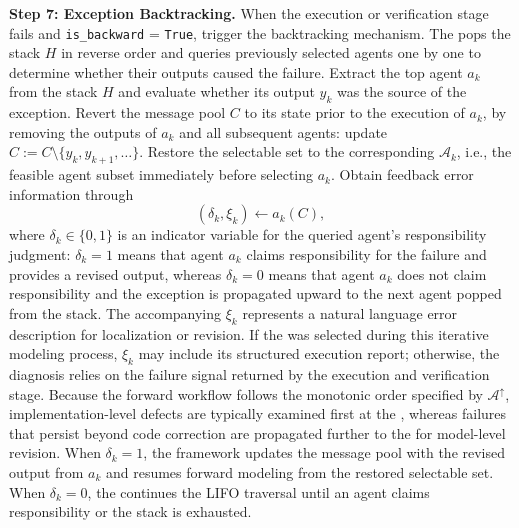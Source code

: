 \documentclass[preprint,12pt]{elsarticle}
\begin{document}
\medskip
\noindent\textbf{Step 7: Exception Backtracking.}
When the execution or verification stage fails and \texttt{is\_backward} = \texttt{True}, trigger the backtracking mechanism. The  pops the stack $H$ in reverse order and queries previously selected agents one by one to determine whether their outputs caused the failure. Extract the top agent $a_k$ from the stack $H$ and evaluate whether its output $y_k$ was the source of the exception. Revert the message pool $C$ to its state prior to the execution of $a_k$, by removing the outputs of $a_k$ and all subsequent agents: update $C:= C\setminus\{y_k,y_{k+1},\ldots\}$. Restore the selectable set to the corresponding $\mathcal{A}_k$, i.e., the feasible agent subset immediately before selecting $a_k$. Obtain feedback error information through
\begin{equation}
\left(\delta_k,\xi_k\right)\gets a_k\left(C\right),
\end{equation}
where $\delta_k\in\{0,1\}$ is an indicator variable for the queried agent's responsibility judgment: $\delta_k=1$ means that agent $a_k$ claims responsibility for the failure and provides a revised output, whereas $\delta_k=0$ means that agent $a_k$ does not claim responsibility and the exception is propagated upward to the next agent popped from the stack. The accompanying $\xi_k$ represents a natural language error description for localization or revision. If the  was selected during this iterative modeling process, $\xi_k$ may include its structured execution report; otherwise, the diagnosis relies on the failure signal returned by the execution and verification stage. Because the forward workflow follows the monotonic order specified by $\mathcal{A}^{\uparrow}$, implementation-level defects are typically examined first at the , whereas failures that persist beyond code correction are propagated further to the  for model-level revision. When $\delta_k=1$, the framework updates the message pool with the revised output from $a_k$ and resumes forward modeling from the restored selectable set. When $\delta_k=0$, the  continues the LIFO traversal until an agent claims responsibility or the stack is exhausted. 
\end{document}
